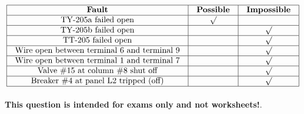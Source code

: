 






$$\vbox{\offinterlineskip
\halign{\strut
\vrule \quad\hfil # \ \hfil & 
\vrule \quad\hfil # \ \hfil & 
\vrule \quad\hfil # \ \hfil \vrule \cr
\noalign{\hrule}
%
{\bf Fault} & {\bf Possible} & {\bf Impossible} \cr
%
\noalign{\hrule}
%
TY-205a failed open & $\surd$ &  \cr
%
\noalign{\hrule}
%
TY-205b failed open &  & $\surd$ \cr
%
\noalign{\hrule}
%
TT-205 failed open &  & $\surd$ \cr
%
\noalign{\hrule}
%
Wire open between terminal 6 and terminal 9 &  & $\surd$ \cr
%
\noalign{\hrule}
%
Wire open between terminal 1 and terminal 7 &  & $\surd$ \cr
%
\noalign{\hrule}
%
Valve \#15 at column \#8 shut off &  & $\surd$ \cr
%
\noalign{\hrule}
%
Breaker \#4 at panel L2 tripped (off) &  & $\surd$ \cr
%
\noalign{\hrule}
} %
}$$ %








{\bf This question is intended for exams only and not worksheets!}.



